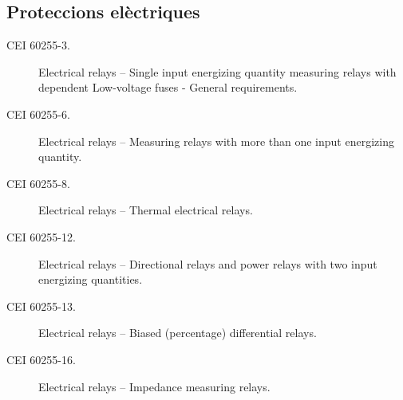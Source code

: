 \subsection*{Proteccions elèctriques}
\begin{description}
    \item [\hspace{5mm}CEI 60255-3.] Electrical relays -- Single input energizing quantity measuring relays with dependent Low-voltage fuses - General requirements.
    \item [\hspace{5mm}CEI 60255-6.] Electrical relays -- Measuring relays with more than one input energizing quantity.
    \item [\hspace{5mm}CEI 60255-8.] Electrical relays -- Thermal electrical relays.
    \item [\hspace{5mm}CEI 60255-12.] Electrical relays -- Directional relays and power relays with two input energizing quantities.
    \item [\hspace{5mm}CEI 60255-13.] Electrical relays -- Biased (percentage) differential relays.
    \item [\hspace{5mm}CEI 60255-16.] Electrical relays -- Impedance measuring relays.
\end{description}


